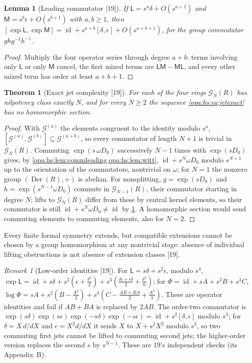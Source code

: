 \documentclass[11pt,oneside]{article}
\numberwithin{equation}{section}
\newtheorem{theorem}{Theorem}[section]
\newtheorem{lemma}[lemma]{Lemma}
\theoremstyle{definition}
\theoremstyle{remark}
\newtheorem{remark}[remark]{Remark}
\newcommand{\id}{\operatorname{id}}
\newcommand{\src}[1]{\textup{\textsf{\small[#1]}}}
\newcommand{\Der}{\operatorname{Der}}
\begin{document}
\begin{lemma}[Leading commutator \src{19}]\label{opa:hs:lem:commleading}
If $\mathsf L=s^a\delta+O(s^{a+1})$ and $\mathsf M=s^b\epsilon+O(s^{b+1})$ with $a,b\ge1$, then
$[\exp\mathsf L,\exp\mathsf M]=\id+s^{a+b}[\delta,\epsilon]+O(s^{a+b+1})$, for the group commutator $ghg^{-1}h^{-1}$.
\end{lemma}
\begin{proof}
Multiply the four operator series through degree $a+b$: terms involving only $\mathsf L$ or only $\mathsf M$ cancel, the first mixed terms are
$\mathsf L\mathsf M-\mathsf M\mathsf L$, and every other mixed term has order at least $a+b+1$.
\end{proof}

\begin{theorem}[Exact jet complexity \src{19}]\label{opa:hs:thm:jetcomplexity}
For each of the four rings $\mathcal G_N(R)$ has nilpotency class exactly $N$, and for every $N\ge2$ the sequence \eqref{opa:hs:eq:jetexact} has no
homomorphic section.
\end{theorem}
\begin{proof}
With $\mathcal G^{(a)}$ the elements congruent to the identity modulo $s^a$, $[\mathcal G^{(a)},\mathcal G^{(b)}]\subseteq\mathcal G^{(a+b)}$, so every commutator of
length $N+1$ is trivial in $\mathcal G_N(R)$. Commuting $\exp(s\,\omega D_0)$ successively $N-1$ times with $\exp(sD_0)$ gives, by
\cref{opa:hs:lem:commleading,opa:hs:lem:witt}, $\id+s^N\omega D_0$ modulo $s^{N+1}$ up to the orientation of the commutators, nontrivial on $\omega$; for $N=1$
the nonzero group $(\Der(R),+)$ is abelian. For nonsplitting, $g=\exp(sD_0)$ and $h=\exp(s^{N-1}\omega D_0)$ commute in $\mathcal G_{N-1}(R)$, their
commutator starting in degree $N$; lifts to $\mathcal G_N(R)$ differ from these by central kernel elements, so their commutator is still
$\id+s^N\omega D_0\ne\id$ by \cref{opa:hs:lem:commleading}. A homomorphic section would send commuting elements to commuting elements, also for $N=2$.
\end{proof}

Every finite formal symmetry extends, but compatible extensions cannot be chosen by a group homomorphism at any nontrivial stage: absence of
individual lifting obstructions is not absence of extension classes \src{19}.

\begin{remark}[Low-order identities \src{19}]\label{opa:hs:rem:loworder}
For $\mathsf L=s\delta+s^2\epsilon$, modulo $s^4$,
$\exp\mathsf L=\id+s\delta+s^2(\epsilon+\frac{\delta^2}2)+s^3(\frac{\delta\epsilon+\epsilon\delta}2+\frac{\delta^3}6)$; for $\Phi=\id+sA+s^2B+s^3C$,
$\log\Phi=sA+s^2(B-\frac{A^2}2)+s^3(C-\frac{AB+BA}2+\frac{A^3}3)$. These are operator identities and fail if $AB+BA$ is replaced by $2AB$. The order-two
commutator is $\exp(s\delta)\exp(s\epsilon)\exp(-s\delta)\exp(-s\epsilon)=\id+s^2[\delta,\epsilon]$ modulo $s^3$; for $\delta=X\,d/dX$ and $\epsilon=X^2d/dX$ it
sends $X$ to $X+s^2X^2$ modulo $s^3$, so two commuting first jets cannot be lifted to commuting second jets; the higher-order version replaces the
second $s$ by $s^{N-1}$. These are 19's independent checks (its Appendix~B).
\end{remark}
\end{document}
